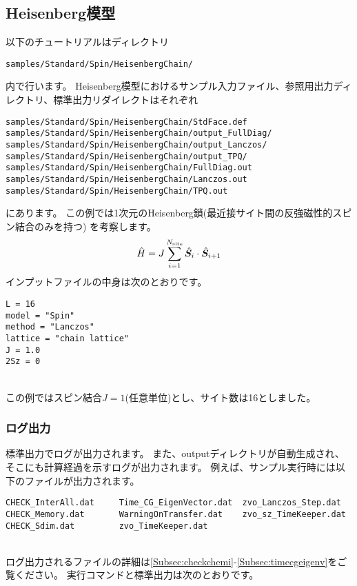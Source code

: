 \subsection{Heisenberg模型}

以下のチュートリアルはディレクトリ
\begin{verbatim}
samples/Standard/Spin/HeisenbergChain/
\end{verbatim}
内で行います。
Heisenberg模型におけるサンプル入力ファイル、参照用出力ディレクトリ、標準出力リダイレクトはそれぞれ
\begin{verbatim}
samples/Standard/Spin/HeisenbergChain/StdFace.def
samples/Standard/Spin/HeisenbergChain/output_FullDiag/
samples/Standard/Spin/HeisenbergChain/output_Lanczos/
samples/Standard/Spin/HeisenbergChain/output_TPQ/
samples/Standard/Spin/HeisenbergChain/FullDiag.out
samples/Standard/Spin/HeisenbergChain/Lanczos.out
samples/Standard/Spin/HeisenbergChain/TPQ.out
\end{verbatim}
にあります。
この例では1次元のHeisenberg鎖(最近接サイト間の反強磁性的スピン結合のみを持つ)
を考察します。
\begin{align}
  {\hat H} = J \sum_{i=1}^{N_{\rm site}} {\hat {\boldsymbol S}}_i \cdot {\hat {\boldsymbol S}}_{i+1}
\end{align}
インプットファイルの中身は次のとおりです。
\\
\begin{minipage}{10cm}
\begin{screen}
\begin{verbatim}
L = 16
model = "Spin"
method = "Lanczos"
lattice = "chain lattice"
J = 1.0
2Sz = 0
\end{verbatim}
\end{screen}
\end{minipage}
%
\\
この例ではスピン結合$J=1$(任意単位)とし、サイト数は16としました。

\subsubsection{ログ出力}
標準出力でログが出力されます。
また、outputディレクトリが自動生成され、
そこにも計算経過を示すログが出力されます。
例えば、サンプル実行時には以下のファイルが出力されます。\\
\begin{minipage}{16cm}
\begin{screen}
\begin{verbatim}
CHECK_InterAll.dat     Time_CG_EigenVector.dat  zvo_Lanczos_Step.dat  
CHECK_Memory.dat       WarningOnTransfer.dat    zvo_sz_TimeKeeper.dat
CHECK_Sdim.dat         zvo_TimeKeeper.dat
\end{verbatim}
\end{screen}
\end{minipage}
\\
ログ出力されるファイルの詳細は\ref{Subsec:checkchemi}-\ref{Subsec:timecgeigenv}をご覧ください。
%
実行コマンドと標準出力は次のとおりです。

